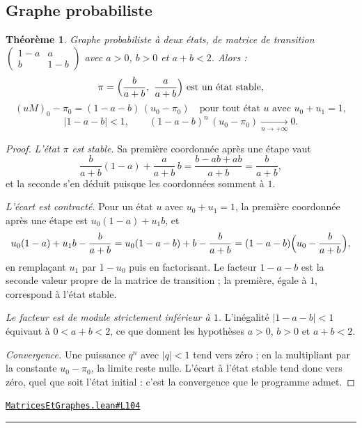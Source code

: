 \documentclass[11pt,a4paper]{article}
\theoremstyle{definition}
\theoremstyle{plain}
\newtheorem{theoreme}{Théorème}
\newcommand{\source}[2]{\par\smallskip\noindent\hfill{\footnotesize\href{#1}{\texttt{#2}}}\par\smallskip}
\begin{document}
\subsection{Graphe probabiliste}

\begin{theoreme}
Graphe probabiliste à deux états, de matrice de transition
$\begin{pmatrix} 1-a & a \\ b & 1-b \end{pmatrix}$ avec $a > 0$, $b > 0$ et $a + b < 2$.
Alors :
\[ \pi = \Bigl(\frac{b}{a+b},\ \frac{a}{a+b}\Bigr) \ \text{est un état stable} , \]
\[ (uM)_0 - \pi_0 = (1 - a - b)\,(u_0 - \pi_0) \quad
   \text{pour tout état } u \text{ avec } u_0 + u_1 = 1 , \]
\[ |1 - a - b| < 1 , \qquad (1-a-b)^{n}\,(u_0 - \pi_0) \xrightarrow[n \to +\infty]{} 0 . \]
\end{theoreme}

\begin{proof}
\emph{L'état $\pi$ est stable.} Sa première coordonnée après une étape vaut
\[ \frac{b}{a+b}(1-a) + \frac{a}{a+b}\,b
   = \frac{b - ab + ab}{a+b} = \frac{b}{a+b} , \]
et la seconde s'en déduit puisque les coordonnées somment à $1$.

\emph{L'écart est contracté.} Pour un état $u$ avec $u_0 + u_1 = 1$, la première
coordonnée après une étape est $u_0(1-a) + u_1 b$, et
\[ u_0(1-a) + u_1 b - \frac{b}{a+b}
   = u_0(1 - a - b) + b - \frac{b}{a+b}
   = (1 - a - b)\Bigl(u_0 - \frac{b}{a+b}\Bigr) , \]
en remplaçant $u_1$ par $1 - u_0$ puis en factorisant. Le facteur $1 - a - b$ est la
seconde valeur propre de la matrice de transition ; la première, égale à $1$, correspond à
l'état stable.

\emph{Le facteur est de module strictement inférieur à $1$.} L'inégalité
$|1 - a - b| < 1$ équivaut à $0 < a + b < 2$, ce que donnent les hypothèses $a > 0$,
$b > 0$ et $a + b < 2$.

\emph{Convergence.} Une puissance $q^{n}$ avec $|q| < 1$ tend vers zéro ; en la multipliant
par la constante $u_0 - \pi_0$, la limite reste nulle. L'écart à l'état stable tend donc
vers zéro, quel que soit l'état initial : c'est la convergence que le programme admet.
\end{proof}
\source{https://github.com/Commutator-IO/learn-lean/blob/main/cours/02-lycee/10-specialite-mathematiques-terminale-s/MatricesEtGraphes.lean\#L104}{MatricesEtGraphes.lean\#L104}

\vfill
\noindent\rule{0.35\linewidth}{0.4pt}\par
{}
\end{document}

